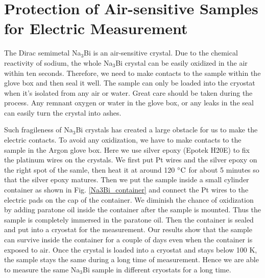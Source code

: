 \section{Protection of Air-sensitive Samples for Electric Measurement}
\label{sec:expsetup:airsensitive}

The Dirac semimetal Na$_3$Bi is an air-sensitive crystal. Due to the chemical reactivity of sodium, the whole Na$_3$Bi crystal can be easily oxidized in the air within ten seconds. Therefore, we need to make contacts to the sample within the glove box and then seal it well. The sample can only be loaded into the cryostat when it's isolated from any air or water. Great care should be taken during the process. Any remnant oxygen or water in the glove box, or any leaks in the seal can easily turn the crystal into ashes. 

Such fragileness of Na$_3$Bi crystals has created a large obstacle for us to make the electric contacts. To avoid any oxidization, we have to make contacts to the sample in the Argon glove box. Here we use silver epoxy (Epotek H20E) to fix the platinum wires on the crystals. We first put Pt wires and the silver epoxy on the right spot of the samle, then heat it at around 120 $\celsius$ for about 5 minutes so that the silver epoxy matures. Then we put the sample inside a small cylinder container as shown in Fig. \ref{Na3Bi_container} and connect the Pt wires to the electric pads on the cap of the container. We diminish the chance of oxidization by adding paratone oil inside the container after the sample is mounted. Thus the sample is completely immersed in the paratone oil. Then the container is sealed and put into a cryostat for the measurement. Our results show that the sample can survive inside the container for a couple of days even when the container is exposed to air. Once the crystal is loaded into a cryostat and stays below 100 K, the sample stays the same during a long time of measurement. Hence we are able to measure the same Na$_3$Bi sample in different cryostats for a long time.


